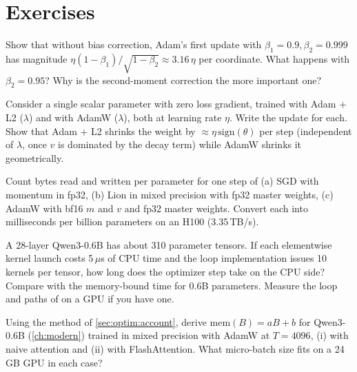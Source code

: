 \section{Exercises}\label{sec:optim:exercises}

\begin{exercise}
Show that without bias correction, Adam's first update with $\beta_1=0.9,\beta_2=0.999$ has
magnitude $\eta(1-\beta_1)/\sqrt{1-\beta_2}\approx3.16\,\eta$ per coordinate. What happens with
$\beta_2=0.95$? Why is the second-moment correction the more important one?
\end{exercise}

\begin{exercise}
Consider a single scalar parameter with zero loss gradient, trained with Adam + L2 ($\lambda$)
and with AdamW ($\lambda$), both at learning rate $\eta$. Write the update for each. Show that
Adam + L2 shrinks the weight by $\approx\eta\,\mathrm{sign}(\theta)$ per step (independent of
$\lambda$, once $v$ is dominated by the decay term) while AdamW shrinks it geometrically.
\end{exercise}

\begin{exercise}
Count bytes read and written per parameter for one step of (a) SGD with momentum in fp32,
(b) Lion in mixed precision with fp32 master weights, (c) AdamW with bf16 $m$ and $v$ and fp32
master weights. Convert each into milliseconds per billion parameters on an H100 (3.35\,TB/s).
\end{exercise}

\begin{exercise}
A 28-layer Qwen3-0.6B has about 310 parameter tensors. If each elementwise kernel launch costs
5\,$\mu$s of CPU time and the loop implementation issues 10 kernels per tensor, how long does
the optimizer step take on the CPU side? Compare with the memory-bound time for 0.6B parameters.
Measure the loop and  paths of  on a GPU if you have one.
\end{exercise}

\begin{exercise}
Using the method of \cref{sec:optim:account}, derive $\text{mem}(B)=aB+b$ for Qwen3-0.6B
(\cref{ch:modern}) trained in mixed precision with AdamW at $T=4096$, (i) with naive attention and
(ii) with FlashAttention. What micro-batch size fits on a 24\,GB GPU in each case?
\end{exercise}

